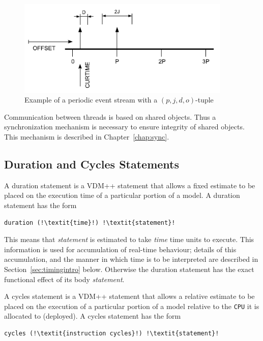 \documentclass{overturerepchap}
\begin{document}
\begin{figure}[!htb]
\begin{center}
\includegraphics[width=4in]{figures/PeriodJitterDelayOffset.PNG}
\end{center}
\caption{Example of a periodic event stream with a $(p,j,d,o)$-tuple\label{fig:perioddef}}
\end{figure}

Communication between threads is based on shared objects. Thus a
synchronization mechanism is necessary to ensure integrity of shared
objects. This mechanism is described in Chapter~\ref{chap:sync}.

\subsection{Duration and Cycles Statements}

A duration statement is a VDM++ statement that allows a fixed estimate to
be placed on the execution time of a particular portion of a model. A
duration statement has the form

\begin{lstlisting}
duration (!\textit{time}!) !\textit{statement}!
\end{lstlisting}

This means that \emph{statement} is estimated to take \emph{time} time
units to execute. This information is used for accumulation of
real-time behaviour; details of this accumulation, and the manner in
which time is to be interpreted are described in
Section~\ref{sec:timingintro} below.  Otherwise the duration statement
has the exact functional effect of its body \textit{statement}.

A cycles statement is a VDM++ statement that allows a relative
estimate to be placed on the execution of a particular portion of a
model relative to the \texttt{CPU} it is allocated to (deployed). A cycles
statement has the form

\begin{lstlisting}
cycles (!\textit{instruction cycles}!) !\textit{statement}!
\end{lstlisting}
\end{document}
